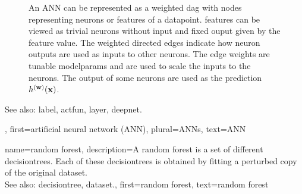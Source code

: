 {{\begin{figure}[H]
\begin{tikzpicture}[>=stealth, node distance=2.3cm and 2.4cm]
 			\end{tikzpicture}
 			\caption{An ANN can be represented as a weighted \gls{dag} with 
			nodes representing neurons or \glspl{feature} of a \gls{datapoint}. \Glspl{feature} 
			can be viewed as trivial neurons without input and fixed ouput given by the 
			\gls{feature} value. The weighted directed edges indicate how neuron outputs are used 
			as inputs to other neurons. The edge weights are tunable \glspl{modelparam} and are 
			used to scale the inputs to the neurons. The output of some neurons are used as the 
			\gls{prediction} $\hypothesis^{(\weights)}(\featurevec)$. \label{fig_ANN_DAG_dict}}
 			\end{figure}
		See also: \gls{label}, \gls{actfun}, \gls{layer}, \gls{deepnet}.},
	first={artificial neural network (ANN)},
	plural={ANNs},
	text={ANN}
}


{name={random forest},
	description={A random forest is a set of different \glspl{decisiontree}. 
		Each of these \glspl{decisiontree} is obtained by fitting a perturbed copy of 
		the original \gls{dataset}.
				\\
		See also: \gls{decisiontree}, \gls{dataset}.},
	first={random forest}, 
	text={random forest}
}


